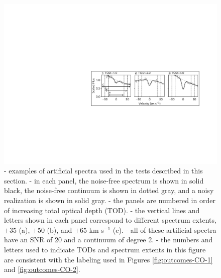 \documentclass[trackchanges]{aastex62}
\begin{document}
\begin{figure}
  \includegraphics[width=\linewidth]{figures/annotated_example_data.pdf}
  \caption{
  - examples of artificial spectra used in the tests described in this section.
  - in each panel, the noise-free spectrum is shown in solid black, the noise-free continuum is shown in dotted gray, and a noisy realization is shown in solid gray.
  - the panels are numbered in order of increasing total optical depth (TOD).
  - the vertical lines and letters shown in each panel correspond to different spectrum extents, $\pm 35$ (a), $\pm 50$ (b), and $\pm 65$ km s$^{-1}$ (c).
  - all of these artificial spectra have an SNR of 20 and a continuum of degree 2.
  - the numbers and letters used to indicate TODs and spectrum extents in this figure are consistent with the labeling used in Figures \ref{fig:outcomes-CO-1} and \ref{fig:outcomes-CO-2}.
  }
  \label{fig:artificial-data-eg}
\end{figure}
\end{document}
